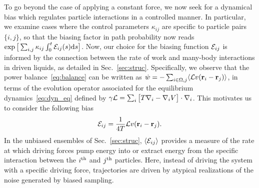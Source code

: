 \documentclass[superscriptaddress, twocolumn, prx, longbibliography, nofootinbib]{revtex4-1}
\begin{document}
To go beyond the case of applying a constant force, we now seek for a dynamical bias which regulates particle interactions in a controlled manner. In particular, we examine cases where the control parameters $\kappa_{ij}$ are specific to particle pairs $\{i,j\}$, so that the biasing factor in path probability now reads $\exp\big[\sum_{i,j}\kappa_{ij}\int_0^t{\cal E}_{ij}(s){\rm d}s\big]$. {Now}, our choice for the biasing function ${\cal E}_{ij}$ is informed by the connection between the rate of work and many-body interactions in driven liquids, as detailed in Sec.~\ref{sec:struc}. Specifically, we observe that the power balance~\eqref{eq:balance} can be written as $\dot w = - \sum_{i\in\Omega,j} \langle{\cal L} v({\bf r}_i-{\bf r}_j)\rangle$, in terms of the evolution operator associated for the equilibrium dynamics~\eqref{eq:dyn_eq} defined by $\gamma{\cal L} = \sum_i\big[ T \nabla_i - \nabla_i V\big] \cdot\nabla_i $. This motivates us to consider the following bias
\begin{equation}\label{eq:eps_bis}
	{\cal E}_{ij} = \frac{1}{4T} {\cal L} v({\bf r}_i-{\bf r}_j) .
\end{equation}
In the unbiased ensembles of Sec.~\ref{sec:struc}, $\langle {\cal E}_{ij} \rangle$ provides a measure of the rate at which driving forces pump energy into or extract energy from the specific interaction between the $i^{\rm th}$ and $j^{\rm th}$ particles. Here, instead of driving the system with a specific driving force, trajectories are driven by atypical realizations of the noise generated by biased sampling.
\end{document}
